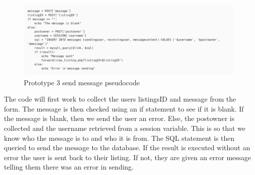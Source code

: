  \begin{figure}[H]
     \centering
     \includegraphics[scale=0.2]{ch3_developing/proto3/message_send.png}
     \caption{Prototype 3 send message pseudocode}
     \label{fig:proto3_sendalg}
 \end{figure} 
The code will first work to collect the users listingsID and message from the form. The message is then checked using an if statement to see if it is blank. If the message is blank, then we send the user an error. Else, the postowner is collected and the username retrieved from a session variable. This is so that we know who the message is to and who it is from. The SQL statement is then queried to send the message to the database. If the result is executed without an error the user is sent back to their listing. If not, they are given an error message telling them there was an error in sending. 

